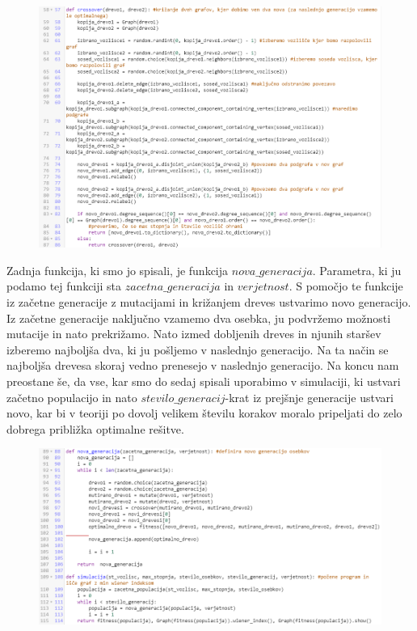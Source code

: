 \documentclass[12pt,a4paper]{amsart}
\theoremstyle{definition} %
\theoremstyle{plain} %
\begin{document}
\begin{figure}[ht]
\centering
\includegraphics[width=1\textwidth]{slika5}
\end{figure}

\pagebreak

Zadnja funkcija, ki smo jo spisali, je funkcija $nova\_generacija$. 
Parametra, ki ju podamo tej funkciji sta $zacetna\_generacija$ in $verjetnost$. 
S pomočjo te funkcije iz začetne generacije z mutacijami in križanjem dreves ustvarimo novo generacijo. Iz začetne generacije naključno vzamemo
dva osebka, ju podvržemo možnosti mutacije in nato prekrižamo. Nato izmed dobljenih dreves in njunih staršev izberemo najboljša dva, ki ju
pošljemo v naslednjo generacijo. Na ta način se najboljša drevesa skoraj vedno prenesejo v naslednjo generacijo.
Na koncu nam preostane še, da vse, kar smo do sedaj spisali uporabimo v simulaciji,
ki ustvari začetno populacijo in nato $stevilo\_generacij$-krat iz prejšnje generacije ustvari novo,
kar bi v teoriji po dovolj velikem številu korakov moralo pripeljati do zelo dobrega približka optimalne rešitve.


\begin{figure}[ht]
\centering
\includegraphics[width=1\textwidth]{slika6}
\end{figure}
\end{document}

